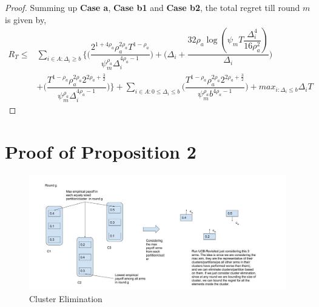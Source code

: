 \begin{proof}
% 
 

 

% 
 
 
Summing up \textbf{Case a}, \textbf{Case b1} and \textbf{Case b2}, the total regret till round $m$ is given by,
\begin{align*}
 R_{T} \leq &\sum\limits_{i\in A:\Delta_{i}\geq b}\bigg\lbrace\bigg(\dfrac{2^{1+4\rho_{a}}\rho_{a}^{2\rho_{a}}T^{1-\rho_{a}}}{\psi_{m}^{\rho_{a}}\Delta_{i}^{4\rho_{a}-1}}\bigg) + \bigg(\Delta_{i}+\dfrac{32\rho_{a}\log{(\psi_{m}T\dfrac{\Delta_{i}^{4}}{16\rho_{a}^{2}})}}{\Delta_{i}}\bigg)\\
&  +  \bigg(\dfrac{T^{1-\rho_{a}}\rho_{a}^{2\rho_{a}}2^{2\rho_{a}+\frac{3}{2}}}{\psi_{m}^{\rho_{a}}\Delta_{i}^{4\rho_{a} -1}} \bigg) \bigg \rbrace+\sum\limits_{i\in A:0\leq\Delta_{i}\leq b}\bigg(\dfrac{T^{1-\rho_{a}}\rho_{a}^{2\rho_{a}}2^{2\rho_{a}+\frac{3}{2}}}{\psi_{m}^{\rho_{a}}b^{4\rho_{a} -1}} \bigg) + max_{i:\Delta_{i}\leq b}\Delta_{i}T
\end{align*}
  
\end{proof}

\section{Proof of Proposition 2}
\label{App:B}

\begin{figure}
\includegraphics[scale=0.3]{img/diagCluster.jpg}
\caption{Cluster Elimination}
\label{Fig:ClusFig}
\end{figure}

